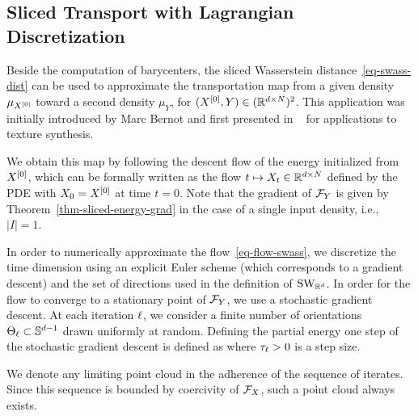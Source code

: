 \subsection{Sliced Transport with Lagrangian Discretization}
\label{subsec-sliced-assignement}

Beside the computation of barycenters, the sliced Wasserstein distance~\eqref{eq-swass-dist} can be used to approximate the transportation map from a given density $\mu_{{X}^{[0]}}$ toward a second density $\mu_{Y}$, for $({X}^{[0]},Y) \in (\mathbb{R}^{d \times N})^2$. This application was initially introduced by Marc Bernot and first presented in ~\cite{Rabin_ssvm11} for applications to texture synthesis.

We obtain this map by following the descent flow of the energy
initialized from ${X}^{[0]}$, which can be formally written as the flow $t \mapsto X_t \in \mathbb{R}^{d \times N}$ defined by the PDE
with $X_0={X}^{[0]}$ at time $t=0$.  Note that the gradient of $\mathcal{F}_Y$ is given by Theorem~\ref{thm-sliced-energy-grad} in the case of a single input density, i.e., $|I|=1$.

In order to numerically approximate  the flow~\eqref{eq-flow-swass}, we discretize the time dimension using an explicit Euler scheme (which corresponds to a gradient descent) and the set of directions used in the definition of $\text{\upshape SW}_{\mathbb{R}^d}$. In order for the flow to converge to a stationary point of $\mathcal{F}_{Y}$, we use a stochastic gradient descent. At each iteration $\ell$, we consider a finite number of orientations $\Theta_\ell \subset \mathbb{S}^{d-1}$ drawn uniformly at random. Defining the partial energy
one step of the stochastic gradient descent is defined as
where $\tau_\ell>0$ is a step size. 

We denote 
any limiting point cloud in the adherence of the sequence of iterates. Since this sequence is bounded by coercivity of $\mathcal{F}_X$, such a point cloud always exists.  

